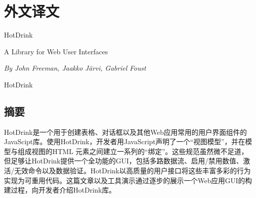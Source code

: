 \chapter*{外\quad 文\quad 译\quad 文}
\pagestyle{empty}

\begin{center}
{\heiti{}HotDrink}

{\heiti{}A Library for Web User Interfaces}

\textsl{By John Freeman, Jaakko Järvi, Gabriel Foust}

{\heiti{} HotDrink}
\end{center}


\section*{摘要}
HotDrink是一个用于创建表格、对话框以及其他Web应用常用的用户界面组件的JavaScipt库。使用HotDrink，开发者用JavaScript声明了一个“视图模型”，并在模型与组成视图的HTML 元素之间建立一系列的“绑定”。这些规范虽然微不足道，但足够让HotDrink提供一个全功能的GUI，包括多路数据流、启用/禁用数值、激活/无效命令以及数据验证。HotDrink以高质量的用户接口将这些丰富多彩的行为实现为可重用代码。这篇文章以及工具演示通过逐步的展示一个Web应用GUI的构建过程，向开发者介绍HotDrink库。
